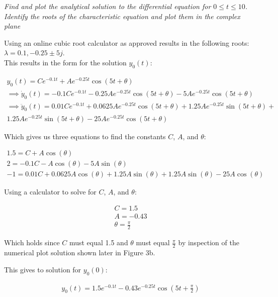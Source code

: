 \documentclass[10pt, AMS Euler]{article}
\begin{document}
\textit{Find and plot the analytical solution to the differential equation for $0 \le t \le 10$. Identify the roots
of the characteristic equation and plot them in the complex plane}

Using an online cubic root calculator as approved results in the following roots: $\lambda = 0.1, -0.25 \pm 5j$.\\

This results in the form for the solution $y_0(t)$: 
\begin{center}
    \begin{align*}
        y_0(t) = Ce^{-0.1t} + Ae^{-0.25t}\cos{(5t + \theta)}\\
        \implies \dot{y}_0(t) = -0.1Ce^{-0.1t} - 0.25Ae^{-0.25t}\cos{(5t + \theta)} - 5Ae^{-0.25t}\cos{(5t + \theta)}\\
        \implies \ddot{y}_0(t) = 0.01Ce^{-0.1t} + 0.0625Ae^{-0.25t}\cos{(5t + \theta)} + 1.25Ae^{-0.25t}\sin{(5t + \theta)} + \\1.25Ae^{-0.25t}\sin{(5t + \theta)} - 25Ae^{-0.25t}\cos{(5t + \theta)}
    \end{align*}
\end{center}

Which gives us three equations to find the constants $C$, $A$, and $\theta$: 
\begin{center}
    \begin{align*}
        1.5 = C + A\cos{(\theta)}\\
        2 = -0.1C - A\cos{(\theta) - 5A\sin{(\theta)}}\\
        -1 = 0.01C + 0.0625A\cos{(\theta)} + 1.25A\sin{(\theta)} + 1.25A\sin{(\theta)} - 25A\cos{(\theta)}
    \end{align*}
\end{center}

Using a calculator to solve for $C$, $A$, and $\theta$:
\begin{center}
    \begin{align*}
        C = 1.5\\
        A = -0.43\\
        \theta=\frac{\pi}{2}
    \end{align*}
\end{center}

Which holds since $C$ must equal 1.5 and $\theta$ must equal $\frac{\pi}{2}$ by inspection of the numerical plot solution shown later in Figure 3b.

This gives to solution for $y_0(0)$: 

\begin{center}
    \begin{align*}
        y_0(t) = 1.5e^{-0.1t} - 0.43e^{-0.25t}\cos{(5t + \frac{\pi}{2})}
    \end{align*}
\end{center}
\end{document}
